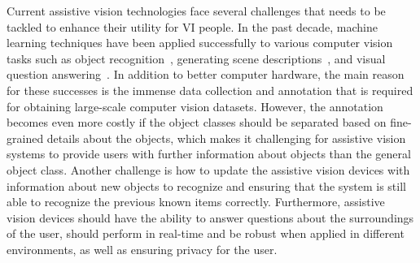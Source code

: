 Current assistive vision technologies face several challenges that needs to be tackled to enhance their utility for VI people. In the past decade, machine learning techniques have been applied successfully to various computer vision tasks such as object recognition~\cite{krizhevsky2012imagenet, he2016deep, dosovitskiy2020image}, generating scene descriptions~\cite{xu2015show, johnson2016densecap, anderson2018bottom}, and visual question answering~\cite{antol2015vqa, hudson2019gqa, hu2019language}. In addition to better computer hardware, the main reason for these successes is the immense data collection and annotation that is required for obtaining large-scale computer vision datasets. However, the annotation becomes even more costly if the object classes should be separated based on fine-grained details about the objects, which makes it challenging for assistive vision systems to provide users with further information about objects than the general object class. Another challenge is how to update the assistive vision devices with information about new objects to recognize and ensuring that the system is still able to recognize the previous known items correctly. Furthermore, assistive vision devices should have the ability to answer questions about the surroundings of the user, should perform in real-time and be robust when applied in different environments, as well as ensuring privacy for the user.





